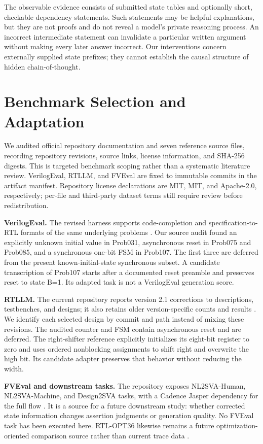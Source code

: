 \documentclass[conference,10pt]{IEEEtran}
\begin{document}
The observable evidence consists of submitted state tables and optionally short, checkable dependency statements. Such statements may be helpful explanations, but they are not proofs and do not reveal a model's private reasoning process. An incorrect intermediate statement can invalidate a particular written argument without making every later answer incorrect. Our interventions concern externally supplied state prefixes; they cannot establish the causal structure of hidden chain-of-thought.

\section{Benchmark Selection and Adaptation}
We audited official repository documentation and seven reference source files, recording repository revisions, source links, license information, and SHA-256 digests. This is targeted benchmark scoping rather than a systematic literature review. VerilogEval, RTLLM, and FVEval are fixed to immutable commits in the artifact manifest. Repository license declarations are MIT, MIT, and Apache-2.0, respectively; per-file and third-party dataset terms still require review before redistribution.

\textbf{VerilogEval.} The revised harness supports code-completion and specification-to-RTL formats of the same underlying problems \cite{verilogeval}. Our source audit found an explicitly unknown initial value in Prob031, asynchronous reset in Prob075 and Prob085, and a synchronous one-bit FSM in Prob107. The first three are deferred from the present known-initial-state synchronous subset. A candidate transcription of Prob107 starts after a documented reset preamble and preserves reset to state B=1. Its adapted task is not a VerilogEval generation score.

\textbf{RTLLM.} The current repository reports version 2.1 corrections to descriptions, testbenches, and designs; it also retains older version-specific counts and results \cite{rtllm}. We identify each selected design by commit and path instead of mixing these revisions. The audited counter and FSM contain asynchronous reset and are deferred. The right-shifter reference explicitly initializes its eight-bit register to zero and uses ordered nonblocking assignments to shift right and overwrite the high bit. Its candidate adapter preserves that behavior without reducing the width.

\textbf{FVEval and downstream tasks.} The repository exposes NL2SVA-Human, NL2SVA-Machine, and Design2SVA tasks, with a Cadence Jasper dependency for the full flow \cite{fveval}. It is a source for a future downstream study: whether corrected state information changes assertion judgments or generation quality. No FVEval task has been executed here. RTL-OPT36 likewise remains a future optimization-oriented comparison source rather than current trace data \cite{rtlopt}.
\end{document}
